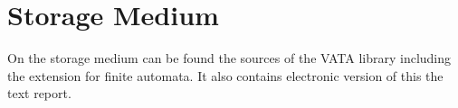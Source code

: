 \chapter{Storage Medium}
On the storage medium can be found the sources of the VATA library including the extension for finite automata. It also contains electronic version of this the text
report.

